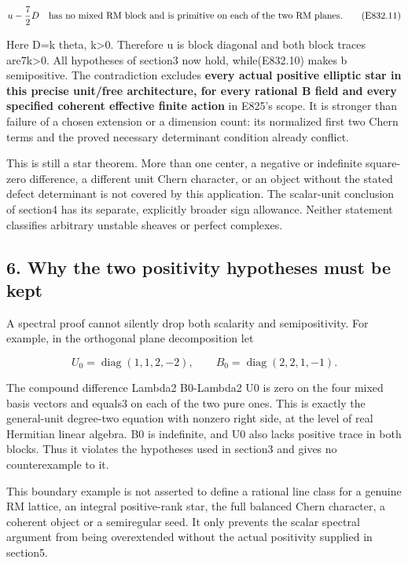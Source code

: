 \[
 u-\frac72D\quad\hbox{has no mixed RM block and is primitive
 on each of the two RM planes.}
 \tag{E832.11}
\]

Here D=k theta, k\textgreater0. Therefore u is block diagonal and both
block traces are7k\textgreater0. All hypotheses of section3 now hold,
while(E832.10) makes b semipositive. The contradiction excludes
\textbf{every actual positive elliptic star in this precise unit/free
architecture, for every rational B field and every specified coherent
effective finite action} in E825's scope. It is stronger than failure of
a chosen extension or a dimension count: its normalized first two Chern
terms and the proved necessary determinant condition already conflict.

This is still a star theorem. More than one center, a negative or
indefinite square-zero difference, a different unit Chern character, or
an object without the stated defect determinant is not covered by this
application. The scalar-unit conclusion of section4 has its separate,
explicitly broader sign allowance. Neither statement classifies
arbitrary unstable sheaves or perfect complexes.

\subsection{6. Why the two positivity hypotheses must be
kept}\label{SF-E832:why-the-two-positivity-hypotheses-must-be-kept}

A spectral proof cannot silently drop both scalarity and semipositivity.
For example, in the orthogonal plane decomposition let

\[
 U_0=\operatorname{diag}(1,1,2,-2),\qquad
 B_0=\operatorname{diag}(2,2,1,-1).
 \tag{E832.12}
\]

The compound difference Lambda2 B0-Lambda2 U0 is zero on the four mixed
basis vectors and equals3 on each of the two pure ones. This is exactly
the general-unit degree-two equation with nonzero right side, at the
level of real Hermitian linear algebra. B0 is indefinite, and U0 also
lacks positive trace in both blocks. Thus it violates the hypotheses
used in section3 and gives no counterexample to it.

This boundary example is not asserted to define a rational line class
for a genuine RM lattice, an integral positive-rank star, the full
balanced Chern character, a coherent object or a semiregular seed. It
only prevents the scalar spectral argument from being overextended
without the actual positivity supplied in section5.


